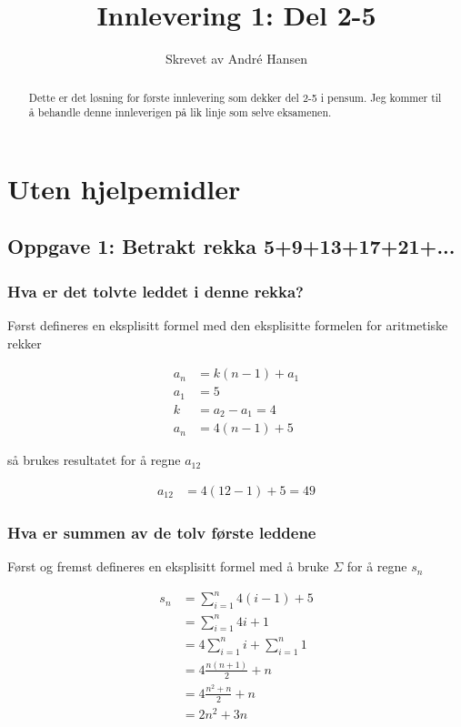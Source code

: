 \documentclass{article}
\title{Innlevering 1: Del 2-5}
\author{Skrevet av André Hansen}
\begin{document}
\maketitle

\begin{abstract}
Dette er det løsning for første innlevering som dekker del 2-5 i pensum. Jeg kommer til å behandle denne innleverigen på lik linje som selve eksamenen.
\end{abstract}

\section{Uten hjelpemidler}

\subsection{Oppgave 1: Betrakt rekka 5+9+13+17+21+...}

\subsubsection{Hva er det tolvte leddet i denne rekka?}

Først defineres en eksplisitt formel med den eksplisitte formelen for aritmetiske rekker

\begin{align*}
    a_n &= k(n-1)+a_1 \\
    a_1 &= 5 \\
    k &= a_2 - a_1 = 4 \\
    a_n &= 4(n-1)+5
\end{align*}

så brukes resultatet for å regne $a_{12}$

\begin{align*}
    a_{12} &= 4(12-1)+5 = 49
\end{align*}

\subsubsection{Hva er summen av de tolv første leddene}

Først og fremst defineres en eksplisitt formel med å bruke $\Sigma$ for å regne $s_n$

\begin{align*}
    s_n &= \sum_{i=1}^{n} 4(i-1)+5 \\
    &= \sum_{i=1}^{n} 4i + 1 \\
    &= 4 \sum_{i=1}^{n} i + \sum_{i=1}^{n} 1 \\
    &= 4 \frac{n(n+1)}{2} + n \\
    &= 4 \frac{n^2+n}{2} + n \\
    &= 2n^2 + 3n
\end{align*}
\end{document}
